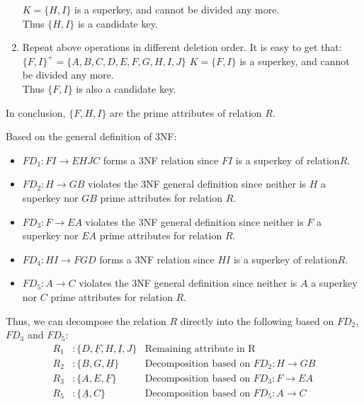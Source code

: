 \documentclass[12pt,letterpaper,titlepage,en-US]{article}
\begin{document}
\begin{homeworkProblem}
\begin{homeworkSubProblem}
\begin{enumerate}[label=\textbf{Step {\arabic*}}, leftmargin=2cm]
                $K = \{H,I\}$ is a superkey, and cannot be divided any more.\\
                Thus $\{H, I\}$ is a candidate key.
            \item Repeat above operations in different deletion order. It is easy to get that:$\{F,I\}^+ = \{A,B,C,D,E,F,G,H,I,J\}$
                $K = \{F,I\}$ is a superkey, and cannot be divided any more.\\
                Thus $\{F, I\}$ is also a candidate key.
        \end{enumerate}
        In conclusion, $\{F, H, I\}$ are the prime attributes of relation $R$.

    \end{homeworkSubProblem}

    \begin{homeworkSubProblem}
        Based on the general definition of 3NF:
        \begin{itemize}
            \item $FD_1: FI \rightarrow EHJC$ forms a 3NF relation since $FI$ is a superkey of relation$R$.
            \item $FD_2: H \rightarrow GB$ violates the 3NF general definition since neither is $H$ a superkey nor $GB$ prime attributes for relation $R$.
            \item $FD_3: F \rightarrow EA$ violates the 3NF general definition since neither is $F$ a superkey nor $EA$ prime attributes for relation $R$.
            \item $FD_4: HI \rightarrow FGD$ forms a 3NF relation since $HI$ is a superkey of relation$R$.
            \item $FD_5: A \rightarrow C$ violates the 3NF general definition since neither is $A$ a superkey nor $C$ prime attributes for relation $R$.
        \end{itemize}

        Thus, we can decompose the relation $R$ directly into the following based on $FD_2$, $FD_3$ and $FD_5$:
        \begin{align*}
            R_1& : \{D, \underline{F}, H, \underline{I}, J\} & \text{Remaining attribute in R}\\
            R_2& : \{B, G, \underline{H}\} & \text{Decomposition based on $FD_2: H \rightarrow GB$}\\
            R_3& : \{A, E, \underline{F}\} & \text{Decomposition based on $FD_3: F \rightarrow EA$}\\
            R_5& : \{\underline{A}, C\} & \text{Decomposition based on $FD_5: A \rightarrow C$}\\
        \end{align*}
    \end{homeworkSubProblem}
\end{homeworkProblem}
\end{document}
